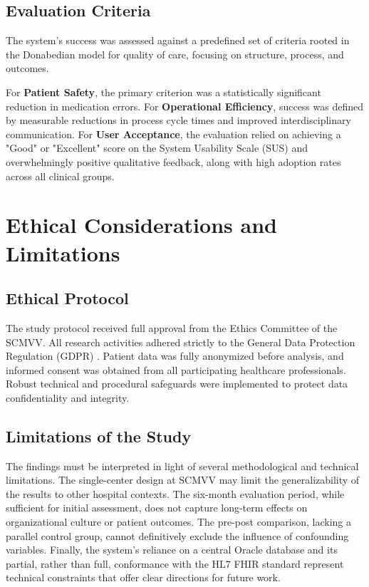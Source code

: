 \subsection{Evaluation Criteria}
The system's success was assessed against a predefined set of criteria rooted in the Donabedian model for quality of care, focusing on structure, process, and outcomes.

For \textbf{Patient Safety}, the primary criterion was a statistically significant reduction in medication errors. For \textbf{Operational Efficiency}, success was defined by measurable reductions in process cycle times and improved interdisciplinary communication. For \textbf{User Acceptance}, the evaluation relied on achieving a "Good" or "Excellent" score on the System Usability Scale (SUS) and overwhelmingly positive qualitative feedback, along with high adoption rates across all clinical groups.

\section{Ethical Considerations and Limitations}

\subsection{Ethical Protocol}
The study protocol received full approval from the Ethics Committee of the SCMVV. All research activities adhered strictly to the General Data Protection Regulation (GDPR) \cite{european2016}. Patient data was fully anonymized before analysis, and informed consent was obtained from all participating healthcare professionals. Robust technical and procedural safeguards were implemented to protect data confidentiality and integrity.

\subsection{Limitations of the Study}
The findings must be interpreted in light of several methodological and technical limitations. The single-center design at SCMVV may limit the generalizability of the results to other hospital contexts. The six-month evaluation period, while sufficient for initial assessment, does not capture long-term effects on organizational culture or patient outcomes. The pre-post comparison, lacking a parallel control group, cannot definitively exclude the influence of confounding variables. Finally, the system's reliance on a central Oracle database and its partial, rather than full, conformance with the HL7 FHIR standard represent technical constraints that offer clear directions for future work.